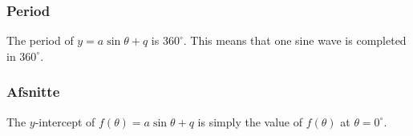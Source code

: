 
\subsubsection*{Period}
The period of $y=a\sin\theta+q$ is $360^{\circ}$. This means that one sine wave is completed in $360^{\circ}$. 


\subsubsection*{Afsnitte}
\nopagebreak
The $y$-intercept of $f(\theta )=a\sin\theta+q$ is simply the value of $f(\theta )$ at $\theta =0^{\circ }$.

